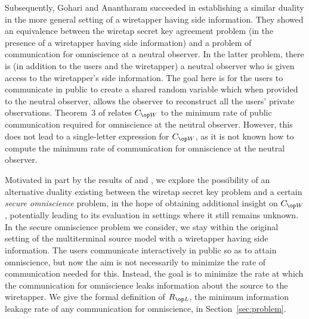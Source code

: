 Subsequently, Gohari and Anantharam \cite{aminsource} succeeded in establishing a similar duality in the more general setting of a wiretapper having side information. They showed an equivalence between the wiretap secret key agreement problem (in the presence of a wiretapper having side information) and a problem of communication for omniscience at a neutral observer. In the latter problem, there is (in addition to the users and the wiretapper) a neutral observer who is given access to the wiretapper's side information. The goal here is for the users to communicate in public to create a shared random variable which when provided to the neutral observer, allows the observer to reconstruct all the users' private observations. Theorem~3 of \cite{aminsource} relates $\wskc$ to the minimum rate of public communication required for omniscience at the neutral observer. However, this does not lead to a single-letter expression for $\wskc$, as it is not known how to compute the minimum rate of communication for omniscience at the neutral observer.

Motivated in part by the results of \cite{csiszar04} and \cite{aminsource}, we explore the possibility of an alternative duality existing between the wiretap secret key problem and a certain \emph{secure omniscience} problem, in the hope of obtaining additional insight on $\wskc$, potentially leading to its evaluation in settings where it still remains unknown. In the secure omniscience problem we consider, we stay within the original setting of the multiterminal source model with a wiretapper having side information. The users communicate interactively in public so as to attain omniscience, but now the aim is not necessarily to minimize the rate of communication needed for this. Instead, the goal is to minimize the rate at which the communication for omniscience leaks information about the source to the wiretapper. We give the formal definition of $\rl$, the minimum information leakage rate of any communication for omniscience, in Section~\ref{sec:problem}. 

